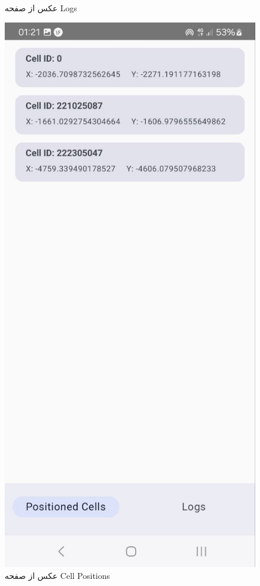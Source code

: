 \documentclass[11pt]{article}
\begin{document}
\begin{figure}[htbp]
\begin{minipage}[b]{0.45\textwidth}
        \caption{عکس از صفحه Logs}
    \end{minipage}
    \hfill
    \begin{minipage}[b]{0.45\textwidth}
        \centering
        \includegraphics[width=\textwidth]{Output2.jpg}
        \caption{عکس از صفحه Cell Positions}
    \end{minipage}
\end{figure}
\end{document}
